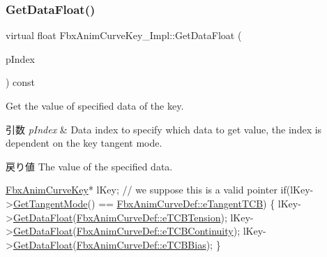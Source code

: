 \subsubsection{\texorpdfstring{Get\+Data\+Float()}{GetDataFloat()}}
{\footnotesize\ttfamily virtual float Fbx\+Anim\+Curve\+Key\+\_\+\+Impl\+::\+Get\+Data\+Float (\begin{DoxyParamCaption}\item[{\hyperlink{class_fbx_anim_curve_def_a3be261d961f8226235529b148cf80300}{Fbx\+Anim\+Curve\+Def\+::\+E\+Data\+Index}}]{p\+Index }\end{DoxyParamCaption}) const\hspace{0.3cm}{\ttfamily [pure virtual]}}

Get the value of specified data of the key. 
\begin{DoxyParams}{引数}
{\em p\+Index} & Data index to specify which data to get value, the index is dependent on the key tangent mode. \\
\hline
\end{DoxyParams}
\begin{DoxyReturn}{戻り値}
The value of the specified data.
\end{DoxyReturn}

\begin{DoxyCode}
\hyperlink{class_fbx_anim_curve_key}{FbxAnimCurveKey}* lKey; \textcolor{comment}{// we suppose this is a valid pointer}
\textcolor{keywordflow}{if}(lKey->\hyperlink{class_fbx_anim_curve_key_a3821c01c7e1b422efcf2fedd074ffb6a}{GetTangentMode}() == \hyperlink{class_fbx_anim_curve_def_ac810ccc5ca0527704ab5175479964b87ae9d885e8a384fd9165123ac47a661dd8}{FbxAnimCurveDef::eTangentTCB})
\{
    lKey->\hyperlink{class_fbx_anim_curve_key_a3185c35241a072105f14327afd275452}{GetDataFloat}(\hyperlink{class_fbx_anim_curve_def_a3be261d961f8226235529b148cf80300a38129a423990a42f94187b77ab041caa}{FbxAnimCurveDef::eTCBTension});
    lKey->\hyperlink{class_fbx_anim_curve_key_a3185c35241a072105f14327afd275452}{GetDataFloat}(\hyperlink{class_fbx_anim_curve_def_a3be261d961f8226235529b148cf80300a5544ce65720f37d5a2620dc32556b2ba}{FbxAnimCurveDef::eTCBContinuity});
    lKey->\hyperlink{class_fbx_anim_curve_key_a3185c35241a072105f14327afd275452}{GetDataFloat}(\hyperlink{class_fbx_anim_curve_def_a3be261d961f8226235529b148cf80300a4ed5dbb6b725478205a3c750c20790d3}{FbxAnimCurveDef::eTCBBias});
\}
\end{DoxyCode}
 \mbox{\label{class_fbx_anim_curve_key___impl_a1179a0392a3cdfeed9219b86539c0beb}} 

